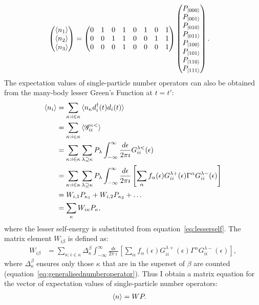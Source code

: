 \begin{align*}
\begin{pmatrix} \braket{n_1} \\\braket{n_2} \\ \braket{n_3}\end{pmatrix} &= \begin{pmatrix} 0 & 1 & 0 & 1 & 0 & 1 & 0 & 1 \\ 0 & 0  &  1  & 1 & 0  &  0  &  1  &  1\\ 0 & 0 & 0 & 1 & 0 & 0 & 0 & 1\\\end{pmatrix} \begin{pmatrix} P_{\ket{000}} \\P_{\ket{001}} \\ P_{\ket{010}} \\ P_{\ket{011}} \\ P_{\ket{100}} \\ P_{\ket{101}} \\ P_{\ket{110}} \\ P_{\ket{111}} \end{pmatrix}.
\end{align*}
The expectation values of single-particle number operators can also be obtained from the  many-body lesser Green's Function at $t=t'$:
\begin{align*}
\braket{n_i} &= \sum_{\kappa: i \in \kappa} \braket{n_\kappa d_i^\dagger (t) d_i (t)} \\
&= \sum_{\kappa: i \in \kappa} \braket{\mathscr{G}^{\kappa<}_{ii}} \\
&= \sum_{\kappa: i \in \kappa} \sum_{\lambda \supseteq \kappa} P_\lambda \int^\infty_{-\infty} \frac{d\epsilon}{2\pi\imath} G^{\lambda<}_{ii} (\epsilon) \\
&= \sum_{\kappa: i \in \kappa} \sum_{\lambda \supseteq \kappa} P_\lambda \int^\infty_{-\infty} \frac{d\epsilon}{2\pi\imath} \left[ \sum_\alpha f_\alpha(\epsilon) G^{\lambda+}_{ii} (\epsilon) \Gamma^\alpha G^{\lambda-}_{ii} (\epsilon)\right] \\
&= W_{i,1} P_{\kappa_1} + W_{i, 2} P_{\kappa_2} + \ldots \\
&= \sum_\kappa W_{i\kappa} P_\kappa,
\end{align*} where the lesser self-energy is substituted from equation~\ref{eq:lesserself}. The matrix element $W_{i\beta}$ is defined as:
\begin{align*}
W_{i\beta} &= \sum_{\kappa: i \in \kappa} \Delta^\beta_\kappa \int^\infty_{-\infty} \frac{d\epsilon}{2\pi\imath} \left[ \sum_\alpha f_\alpha(\epsilon) G^{\lambda+}_{ii} (\epsilon) \Gamma^\alpha G^{\lambda-}_{ii} (\epsilon)\right],
\end{align*} where $\Delta^\beta_\kappa$ ensures only those $\kappa$ that are in the superset of $\beta$ are counted (equation~\ref{eq:generalisednumberoperator}). Thus I obtain a matrix equation for the vector of expectation values of single-particle number operators:
\begin{align}
\braket{n} &= WP. \label{eq:nwp}
\end{align}

